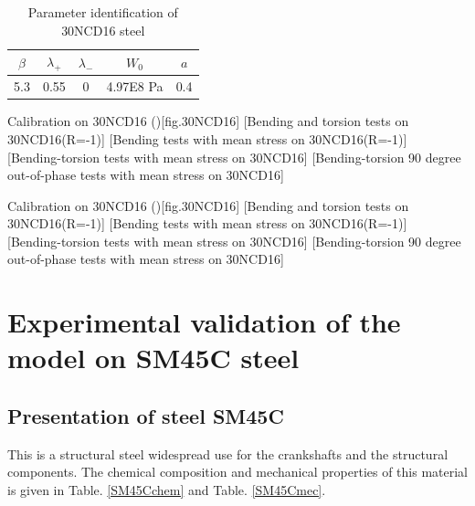\begin{table}[!h]
\centering
\begin{tabular}{|c|c|c|c|c|}
	\hline
	\textbf{$\beta$} & \textbf{$\lambda_+$} & \textbf{$\lambda_-$} & \textbf{$W_0$} & \textbf{$a$}  \\ \hline
	5.3     & 0.55 &0         &4.97E8 Pa  & 0.4    \\ \hline
\end{tabular}
\caption{Parameter identification of 30NCD16 steel}
\label{30ncdpara2}
\end{table}

\begin{Figure}[!h]{Calibration on  30NCD16 (\cite{Dubar1992})}[fig.30NCD16]
	[Bending and torsion tests on 30NCD16(R=-1)]
	[Bending tests with mean stress on 30NCD16(R=-1)]
	\\
	[Bending-torsion tests with mean stress on 30NCD16]
	[Bending-torsion 90 degree out-of-phase tests with mean stress on 30NCD16]
\end{Figure}

\begin{Figure}[!h]{Calibration on  30NCD16 (\cite{Dubar1992})}[fig.30NCD16]
[Bending and torsion tests on 30NCD16(R=-1)]
[Bending tests with mean stress on 30NCD16(R=-1)]
\\
[Bending-torsion tests with mean stress on 30NCD16]
[Bending-torsion 90 degree out-of-phase tests with mean stress on 30NCD16]
\end{Figure}


\clearpage
\section{Experimental validation of the model on SM45C steel}
\subsection{Presentation of steel SM45C}
This is a structural steel widespread use for the crankshafts and the structural components. The chemical composition and mechanical properties of this material is given in Table. \ref{SM45Cchem} and Table. \ref{SM45Cmec}.

